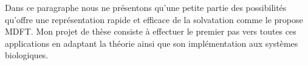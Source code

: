Dans ce paragraphe nous ne présentons qu'une petite partie des possibilités qu'offre une représentation rapide et efficace de la solvatation comme le propose MDFT. Mon projet de thèse consiste à effectuer le premier pas vers toutes ces applications en adaptant la théorie ainsi que son implémentation aux systèmes biologiques.




\vspace{8\baselineskip}




